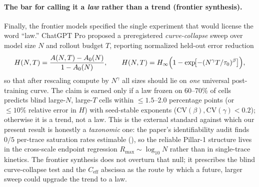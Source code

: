 \paragraph{The bar for calling it a \emph{law} rather than a trend (frontier synthesis).}
Finally, the frontier models specified the single experiment that would
license the word ``law.'' ChatGPT Pro proposed a preregistered
\emph{curve-collapse} sweep over model size $N$ and rollout budget $T$,
reporting normalized held-out error reduction
\begin{equation}
  \label{eq:frontier-collapse}
  H(N,T) = \frac{A(N,T) - A_0(N)}{1 - A_0(N)},
  \qquad
  H(N,T) = H_\infty\Bigl(1 - \exp\!\bigl[-(N^{\gamma} T / \tau_0)^{\beta}\bigr]\Bigr),
\end{equation}
so that after rescaling compute by $N^{\gamma}$ all sizes should lie on
\emph{one} universal post-training curve. The claim is earned only if a law
frozen on 60--70\% of cells predicts blind large-$N$, large-$T$ cells within
$\le 1.5$--$2.0$ percentage points (or $\le 10\%$ relative error in $H$) with
seed-stable exponents ($\mathrm{CV}(\beta),\mathrm{CV}(\gamma)<0.2$);
otherwise it is a trend, not a law. This is the external standard against
which our present result is honestly a \emph{taxonomic} one: the paper's
identifiability audit finds $0/5$ per-trace saturation rates estimable
(), so the reliable Pillar-1 structure lives in
the cross-scale endpoint regression $R_{\max}\sim\log_{10}N$ rather than in
single-trace kinetics. The frontier synthesis does not overturn that null; it
prescribes the blind curve-collapse test and the $C_{\mathrm{eff}}$ abscissa
as the route by which a future, larger sweep could upgrade the trend to a law.
